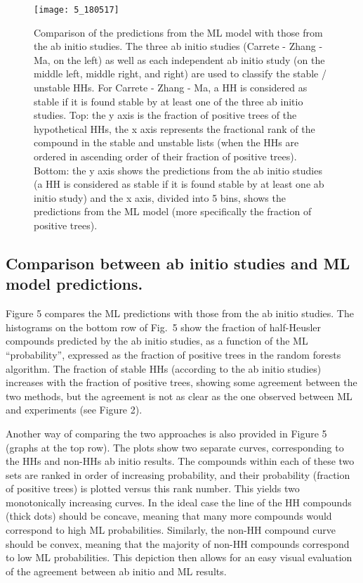\documentclass[pt10,journal=jacsat,manuscript=article,layout=twocolumn]{achemso}
\begin{document}
\begin{figure*}
\texttt{[image: 5\_180517]}

\caption{Comparison of the predictions from the ML model with those from the ab initio studies. The three ab initio studies (Carrete - Zhang - Ma, on the left) as well as each independent ab initio study (on the middle left, middle right, and right) are used to classify the stable / unstable HHs. For Carrete - Zhang - Ma, a HH is considered as stable if it is found stable by at least one of the three ab initio studies. Top: the y axis is the fraction of positive trees of the hypothetical HHs, the x axis represents the fractional rank of the compound in the stable and unstable lists (when the HHs are ordered in ascending order of their fraction of positive trees). Bottom: the y axis shows the predictions from the ab initio studies (a HH is considered as stable if it is found stable by at least one ab initio study) and the x axis, divided into 5 bins, shows the predictions from the ML model (more specifically the fraction of positive trees).}
\end{figure*}


\subsection{Comparison between ab initio studies and ML model predictions.}
Figure 5 compares the ML predictions with those from the ab initio studies. The histograms on the bottom row of Fig.~5 show the fraction of half-Heusler compounds predicted by the ab initio studies,  as a function of the ML ``probability'', expressed as the fraction of positive trees in the random forests algorithm.
The fraction of stable HHs (according to the ab initio studies) increases with the fraction of positive trees, showing some agreement between the two methods, but the agreement is not as clear as the one observed between ML and experiments (see Figure 2). 

Another way of comparing the two approaches is also provided in Figure 5 (graphs at the top row). The plots show two separate curves, corresponding to the HHs and non-HHs ab initio results. The compounds within each of these two sets are ranked in order of increasing probability, and their probability (fraction of positive trees) is plotted versus this rank number. This yields two monotonically increasing curves. In the ideal case the line of the HH compounds (thick dots) should be concave, meaning that many more compounds would correspond to high ML probabilities. Similarly, the non-HH compound curve should be convex, meaning that the majority of non-HH compounds correspond to low ML probabilities. This depiction then allows for an easy visual evaluation of the agreement between ab initio and ML results.
\end{document}

